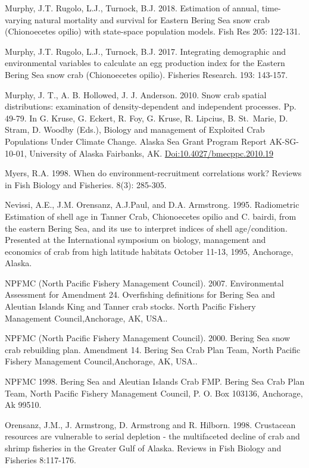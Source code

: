 \documentclass[
]{article}
\begin{document}
Murphy, J.T. Rugolo, L.J., Turnock, B.J. 2018. Estimation of annual, time-varying natural mortality and survival for Eastern Bering Sea snow crab (Chionoecetes opilio) with state-space population models. Fish Res 205: 122-131.

Murphy, J.T. Rugolo, L.J., Turnock, B.J. 2017. Integrating demographic and environmental variables to calculate an egg production index for the Eastern Bering Sea snow crab (Chionoecetes opilio). Fisheries Research. 193: 143-157.

Murphy, J. T., A. B. Hollowed, J. J. Anderson. 2010. Snow crab spatial distributions: examination of density-dependent and independent processes. Pp. 49-79. In G. Kruse, G. Eckert, R. Foy, G. Kruse, R. Lipcius, B. St.~Marie, D. Stram, D. Woodby (Eds.), Biology and management of Exploited Crab Populations Under Climate Change. Alaska Sea Grant Program Report AK-SG-10-01, University of Alaska Fairbanks, AK. \url{Doi:10.4027/bmecppc.2010.19}

Myers, R.A. 1998. When do environment-recruitment correlations work? Reviews in Fish Biology and Fisheries. 8(3): 285-305.

Nevissi, A.E., J.M. Orensanz, A.J.Paul, and D.A. Armstrong. 1995. Radiometric Estimation of shell age in Tanner Crab, Chionoecetes opilio and C. bairdi, from the eastern Bering Sea, and its use to interpret indices of shell age/condition. Presented at the International symposium on biology, management and economics of crab from high latitude habitats October 11-13, 1995, Anchorage, Alaska.

NPFMC (North Pacific Fishery Management Council). 2007. Environmental Assessment for Amendment 24. Overfishing definitions for Bering Sea and Aleutian Islands King and Tanner crab stocks. North Pacific Fishery Management Council,Anchorage, AK, USA..

NPFMC (North Pacific Fishery Management Council). 2000. Bering Sea snow crab rebuilding plan. Amendment 14. Bering Sea Crab Plan Team, North Pacific Fishery Management Council,Anchorage, AK, USA..

NPFMC 1998. Bering Sea and Aleutian Islands Crab FMP. Bering Sea Crab Plan Team, North Pacific Fishery Management Council, P. O. Box 103136, Anchorage, Ak 99510.

Orensanz, J.M., J. Armstrong, D. Armstrong and R. Hilborn. 1998. Crustacean resources are vulnerable to serial depletion - the multifaceted decline of crab and shrimp fisheries in the Greater Gulf of Alaska. Reviews in Fish Biology and Fisheries 8:117-176.
\end{document}
